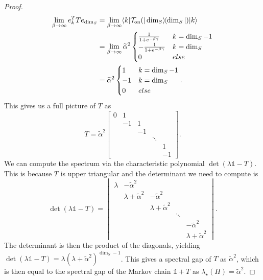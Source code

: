 \documentclass{article}
\newcommand{\on}{\rm on}
\newcommand{\ket}[1]{|#1\rangle}
\newcommand{\bra}[1]{\langle #1|}
\newcommand{\ketbra}[2]{| #1\rangle\! \langle #2|}
\newcommand{\identity}{\mathds{1}}
\begin{document}
\begin{proof}
\begin{align}
    \lim_{\beta \to \infty}  e_{k}^T T e_{\dim_S} &= \lim_{\beta \to \infty}  \bra{k} \mathcal{T}_{\on}(\ketbra{\dim_S}{\dim_S}) \ket{k} \\
    &= \lim_{\beta \to \infty} \widetilde{\alpha}^2 \begin{cases}
        \frac{1}{1 + e^{-\beta \gamma}} & k = \dim_S - 1 \\
        - \frac{1}{1 + e^{-\beta \gamma}} & k = \dim_S \\
        0 & else
    \end{cases} \\
    &= \widetilde{\alpha}^2 \begin{cases} 1 & k = \dim_S - 1 \\ -1 & k = \dim_S \\ 0 & else \end{cases} .
    \end{align}
This gives us a full picture of $T$ as 
\begin{equation}
    T = \widetilde{\alpha}^2 \begin{bmatrix}
        0 & 1 &   &\\
        & -1 & 1 &  &\\
        & & -1  & & \\
        & & & \ddots & \\
        & &     &       & 1 \\
        & &  & & -1
    \end{bmatrix}.
\end{equation}
We can compute the spectrum via the characteristic polynomial $\det(\lambda \identity - T)$. This is because $T$ is upper triangular and the determinant we need to compute is
\begin{equation}
    \det(\lambda \identity - T) =  \begin{vmatrix}
        \lambda & -\widetilde{\alpha}^2 &   &\\
        & \lambda + \widetilde{\alpha}^2 & -\widetilde{\alpha}^2 &  &\\
        & & \lambda + \widetilde{\alpha}^2  & & \\
        & & & \ddots & \\
        & &     &       & -\widetilde{\alpha}^2 \\
        & &  & & \lambda + \widetilde{\alpha}^2
    \end{vmatrix}.
\end{equation}
The determinant is then the product of the diagonals, yielding $\det(\lambda \identity - T) = \lambda (\lambda + \widetilde{\alpha}^2)^{\dim_S - 1}$. This gives a spectral gap of $T$ as $\widetilde{\alpha}^2$, which is then equal to the spectral gap of the Markov chain $\identity + T$ as $\lambda_{\star}(H) = \widetilde{\alpha}^2$.


\end{proof}
\end{document}
